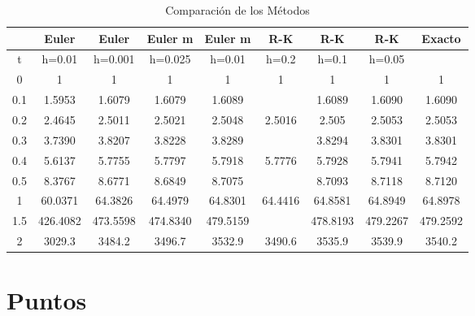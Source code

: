 \documentclass[12pt]{article}
\begin{document}
\begin{table}[h]
	\centering
	\begin{tabular}{|c|c|c|c|c|c|c|c|c|}
		\hline
		&Euler&Euler&Euler m&Euler m&R-K&R-K&R-K&Exacto\\
		\hline
		t & h=0.01 & h=0.001 & h=0.025 & h=0.01 & h=0.2 & h=0.1 & h=0.05 &\\
		\hline
		0&1&1&1&1&1&1&1&1\\
		\hline
		0.1&1.5953&1.6079&1.6079&1.6089&&1.6089&1.6090&1.6090\\
		\hline
		0.2&2.4645&2.5011&2.5021&2.5048&2.5016&2.505&2.5053&2.5053\\
		\hline
		0.3&3.7390&3.8207&3.8228&3.8289&&3.8294&3.8301&3.8301\\
		\hline
		0.4&5.6137&5.7755&5.7797&5.7918&5.7776&5.7928&5.7941&5.7942\\
		\hline
		0.5&8.3767&8.6771&8.6849&8.7075&&8.7093&8.7118&8.7120\\
		\hline
		1&60.0371&64.3826&64.4979&64.8301&64.4416&64.8581&64.8949&64.8978\\
		\hline
		1.5&426.4082&473.5598&474.8340&479.5159&&478.8193&479.2267&479.2592\\
		\hline
		2&3029.3&3484.2&3496.7&3532.9&3490.6&3535.9&3539.9&3540.2\\
		\hline
	\end{tabular}
	\caption{Comparación de los Métodos}
	\label{table1}
\end{table}
\newpage
\section{Puntos}
\end{document}
